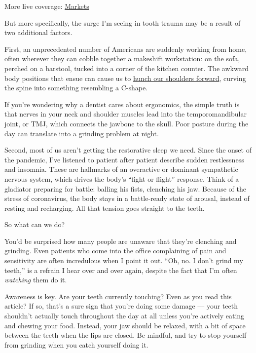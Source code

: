 More live coverage:
\href{https://www.nytimes3xbfgragh.onion/live/2020/09/08/business/stock-market-today-coronavirus?action=click\&pgtype=Article\&state=default\&region=MAIN_CONTENT_1\&context=storylines_live_updates}{Markets}

But more specifically, the surge I'm seeing in tooth trauma may be a
result of two additional factors.

First, an unprecedented number of Americans are suddenly working from
home, often wherever they can cobble together a makeshift workstation:
on the sofa, perched on a barstool, tucked into a corner of the kitchen
counter. The awkward body positions that ensue can cause us to
\href{https://www.nytimes3xbfgragh.onion/2020/09/04/well/live/ergonomics-work-from-home-injuries.html}{hunch
our shoulders forward}, curving the spine into something resembling a
C-shape.

If you're wondering why a dentist cares about ergonomics, the simple
truth is that nerves in your neck and shoulder muscles lead into the
temporomandibular joint, or TMJ, which connects the jawbone to the
skull. Poor posture during the day can translate into a grinding problem
at night.

Second, most of us aren't getting the restorative sleep we need. Since
the onset of the pandemic, I've listened to patient after patient
describe sudden restlessness and insomnia. These are hallmarks of an
overactive or dominant sympathetic nervous system, which drives the
body's ``fight or flight'' response. Think of a gladiator preparing for
battle: balling his fists, clenching his jaw. Because of the stress of
coronavirus, the body stays in a battle-ready state of arousal, instead
of resting and recharging. All that tension goes straight to the teeth.

So what can we do?

You'd be surprised how many people are unaware that they're clenching
and grinding. Even patients who come into the office complaining of pain
and sensitivity are often incredulous when I point it out. ``Oh, no. I
don't grind my teeth,'' is a refrain I hear over and over again, despite
the fact that I'm often \emph{watching} them do it.

Awareness is key. Are your teeth currently touching? Even as you read
this article? If so, that's a sure sign that you're doing some damage
--- your teeth shouldn't actually touch throughout the day at all unless
you're actively eating and chewing your food. Instead, your jaw should
be relaxed, with a bit of space between the teeth when the lips are
closed. Be mindful, and try to stop yourself from grinding when you
catch yourself doing it.

